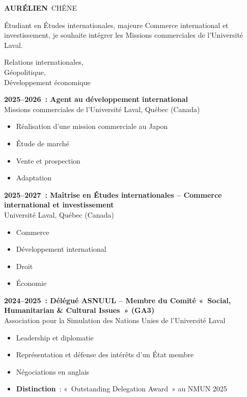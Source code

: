 \documentclass[10pt,a4paper]{article}
\newcommand{\maintitle}[1]{%
  \vspace{9pt}{\color{bleu}\bfseries\large\textls[200]{\MakeUppercase{#1}}}\par\vspace{4pt}}
\begin{document}
\hspace{0.8cm}%
\begin{minipage}[t][285mm][t]{11.3cm}
  \vspace{0.9cm}
  {\color{bleu}\fontsize{26}{28}\selectfont\bfseries AURÉLIEN}\ {\color{bleu}\fontsize{26}{28}\selectfont CHÊNE}\par\vspace{6pt}
  {\small Étudiant en Études internationales, majeure Commerce international et
  investissement, je souhaite intégrer les Missions commerciales de
  l'Université Laval.\par}
  \vspace{3pt}
  {\scriptsize\hfill\begin{minipage}{4.2cm}\raggedleft
  Relations internationales,\\ Géopolitique,\\ Développement économique\end{minipage}\par}

  \maintitle{Formations}
  \small
  \textbf{2025--2026~: Agent au développement international}\\
  Missions commerciales de l'Université Laval, Québec (Canada)
  \begin{itemize}
    \item Réalisation d'une mission commerciale au Japon
    \item Étude de marché
    \item Vente et prospection
    \item Adaptation
  \end{itemize}
  \vspace{5pt}

  \textbf{2025--2027~: Maîtrise en Études internationales -- Commerce international et investissement}\\
  Université Laval, Québec (Canada)
  \begin{itemize}
    \item Commerce
    \item Développement international
    \item Droit
    \item Économie
  \end{itemize}
  \vspace{5pt}

  \textbf{2024--2025~: Délégué ASNUUL -- Membre du Comité «~Social, Humanitarian \& Cultural Issues~» (GA3)}\\
  Association pour la Simulation des Nations Unies de l'Université Laval
  \begin{itemize}
    \item Leadership et diplomatie
    \item Représentation et défense des intérêts d'un État membre
    \item Négociations en anglais
    \item \textbf{Distinction}~: «~Outstanding Delegation Award~» au NMUN 2025
  \end{itemize}
  \vspace{5pt}


\end{minipage}
\end{document}
